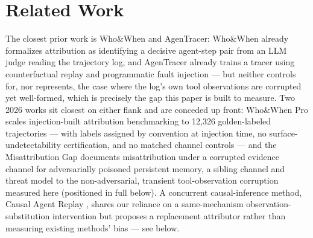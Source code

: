\documentclass[11pt]{article}
\begin{document}
\section{Related Work}

The closest prior work is Who\&When and AgenTracer: Who\&When already formalizes attribution as identifying a decisive agent-step pair from an LLM judge reading the trajectory log, and AgenTracer already trains a tracer using counterfactual replay and programmatic fault injection --- but neither controls for, nor represents, the case where the log's own tool observations are corrupted yet well-formed, which is precisely the gap this paper is built to measure. Two 2026 works sit closest on either flank and are conceded up front: Who\&When Pro \citep{WhoWhenPro260709996} scales injection-built attribution benchmarking to 12,326 golden-labeled trajectories --- with labels assigned by convention at injection time, no surface-undetectability certification, and no matched channel controls --- and the Misattribution Gap \citep{MisattributionGap260522842} documents misattribution under a corrupted evidence channel for adversarially poisoned persistent memory, a sibling channel and threat model to the non-adversarial, transient tool-observation corruption measured here (positioned in full below). A concurrent causal-inference method, Causal Agent Replay \citep{CausalAgentReplay260608275}, shares our reliance on a same-mechanism observation-substitution intervention but proposes a replacement attributor rather than measuring existing methods' bias --- see below.
\end{document}
